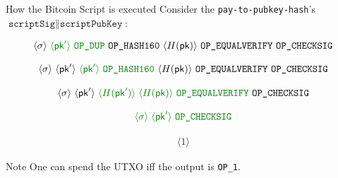 \documentclass{zkdl-presentation-template}
\newcommand{\elem}[1]{\, \langle #1 \rangle \,}
\newcommand{\opcode}[1]{\, \texttt{#1} \,}
\begin{document}
    \begin{frame}{How the Bitcoin Script is executed}
        Consider the \texttt{pay-to-pubkey-hash}'s $\texttt{scriptSig} \parallel \texttt{scriptPubKey}$:
      \begin{empheqboxed}
        \scriptsize
        \begin{align*}
            \elem{\sigma} \textcolor{green!50!black}{\elem{\mathsf{pk}'}\opcode{\texttt{OP\_DUP}}} \opcode{\texttt{OP\_HASH160}} \elem{H(\mathsf{pk})} \opcode{OP\_EQUALVERIFY} 
            \opcode{OP\_CHECKSIG}
        \end{align*}
      \end{empheqboxed}\pause
      \begin{empheqboxed}
        \scriptsize
        \begin{align*}
            \elem{\sigma} \elem{\mathsf{pk}'}\textcolor{green!50!black}{\elem{\mathsf{pk}'} \opcode{\texttt{OP\_HASH160}}} \elem{H(\mathsf{pk})} \opcode{OP\_EQUALVERIFY} 
            \opcode{OP\_CHECKSIG}
        \end{align*}
      \end{empheqboxed}\pause
      \begin{empheqboxed}
        \scriptsize
        \begin{align*}
            \elem{\sigma} \elem{\mathsf{pk}'}\textcolor{green!50!black}{\elem{H(\mathsf{pk}')} \elem{H(\mathsf{pk})} \opcode{OP\_EQUALVERIFY}}
            \opcode{OP\_CHECKSIG}
        \end{align*}
      \end{empheqboxed}\pause
      \begin{empheqboxed}
        \scriptsize
        \begin{align*}
            \textcolor{green!50!black}{\elem{\sigma} \elem{\mathsf{pk}'}
            \opcode{OP\_CHECKSIG}}
        \end{align*}
      \end{empheqboxed}\pause
      \begin{empheqboxed}
        \scriptsize
        \begin{align*}
            \elem{1}
        \end{align*}
      \end{empheqboxed}\pause

      \begin{block}{Note}
          One can spend the UTXO iff the output is \texttt{OP\_1}. 
      \end{block}
    \end{frame}
\end{document}
